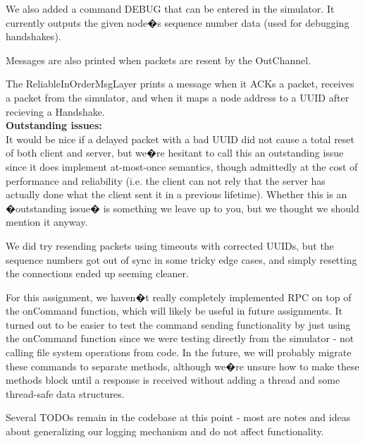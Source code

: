 \documentclass[11pt]{article}
\begin{document}
We also added a command DEBUG that can be entered in the simulator. It currently outputs the given node�s sequence number data (used for debugging handshakes).

Messages are also printed when packets are resent by the OutChannel.

The ReliableInOrderMsgLayer prints a message when it ACKs a packet, receives a packet from the simulator, and when it maps a node address to a UUID after recieving a Handshake. \\

\textbf{Outstanding issues:} \\

It would be nice if a delayed packet with a bad UUID did not cause a total reset of both client and server, but we�re hesitant to call this an outstanding issue since it does implement at-most-once semantics, though admittedly at the cost of performance and reliability (i.e. the client can not rely that the server has actually done what the client sent it in a previous lifetime). Whether this is an �outstanding issue� is something we leave up to you, but we thought we should mention it anyway.

We did try resending packets using timeouts with corrected UUIDs, but the sequence numbers got out of sync in some tricky edge cases, and simply resetting the connections ended up seeming cleaner.

For this assignment, we haven�t really completely implemented RPC on top of the onCommand function, which will likely be useful in future assignments. It turned out to be easier to test the command sending functionality by just using the onCommand function since we were testing directly from the simulator - not calling file system operations from code. In the future, we will probably migrate these commands to separate methods, although we�re unsure how to make these methods block until a response is received without adding a thread and some thread-safe data structures.

Several TODOs remain in the codebase at this point - most are notes and ideas about generalizing our logging mechanism and do not affect functionality. \\
\end{document}
